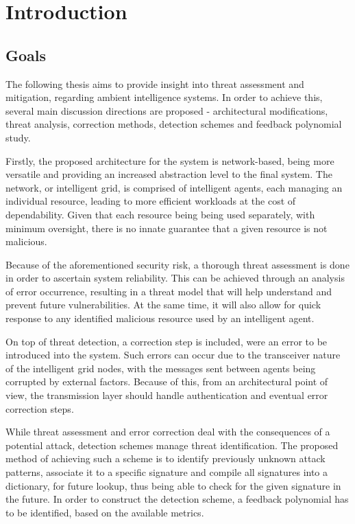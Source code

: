 \documentclass[12pt, english, a4paper]{report}
\begin{document}
\let\oldref\ref
\renewcommand{\ref}[1]{(\oldref{#1})}
\renewcommand\bibname{References}

\setlength{\parindent}{0pt}
\setlength{\parskip}{8pt}

\chapter{Introduction}

\section{Goals}

The following thesis aims to provide insight into threat assessment and mitigation, regarding ambient intelligence systems.
In order to achieve this, several main discussion directions are proposed - architectural modifications, threat analysis, correction
methods, detection schemes and feedback polynomial study.

Firstly, the proposed architecture for the system is network-based, being more versatile and providing an increased abstraction level
to the final system. The network, or intelligent grid, is comprised of intelligent agents, each managing an individual resource, leading
to more efficient workloads at the cost of dependability. Given that each resource being being used separately, with minimum oversight,
there is no innate guarantee that a given resource is not malicious.

Because of the aforementioned security risk, a thorough threat assessment is done in order to ascertain system reliability. This can
be achieved through an analysis of error occurrence, resulting in a threat model that will help understand and prevent future vulnerabilities.
At the same time, it will also allow for quick response to any identified malicious resource used by an intelligent agent.

On top of threat detection, a correction step is included, were an error to be introduced into the system. Such errors can occur due to
the transceiver nature of the intelligent grid nodes, with the messages sent between agents being corrupted by external factors. Because of
this, from an architectural point of view, the transmission layer should handle authentication and eventual error correction steps.

While threat assessment and error correction deal with the consequences of a potential attack, detection schemes manage threat identification.
The proposed method of achieving such a scheme is to identify previously unknown attack patterns, associate it to a specific signature and
compile all signatures into a dictionary, for future lookup, thus being able to check for the given signature in the future. In order to
construct the detection scheme, a feedback polynomial has to be identified, based on the available metrics.
\end{document}
